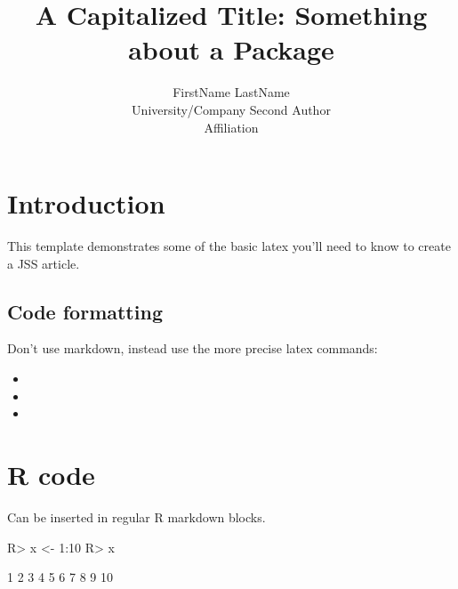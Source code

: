 \documentclass[article]{jss}
\author{
FirstName LastName\\University/Company \And Second Author\\Affiliation
}
\title{A Capitalized Title: Something about a Package \pkg{foo}}
\begin{document}
\hypertarget{introduction}{%
\section{Introduction}\label{introduction}}

This template demonstrates some of the basic latex you'll need to know
to create a JSS article.

\hypertarget{code-formatting}{%
\subsection{Code formatting}\label{code-formatting}}

Don't use markdown, instead use the more precise latex commands:

\begin{itemize}
\item
\item
\item
\end{itemize}

\hypertarget{r-code}{%
\section{R code}\label{r-code}}

Can be inserted in regular R markdown blocks.

\begin{CodeChunk}

\begin{CodeInput}
R> x <- 1:10
R> x
\end{CodeInput}

\begin{CodeOutput}
 [1]  1  2  3  4  5  6  7  8  9 10
\end{CodeOutput}
\end{CodeChunk}
\end{document}
